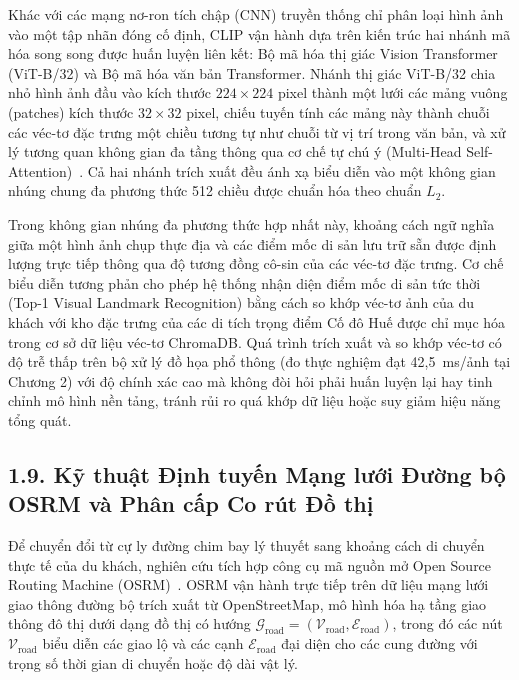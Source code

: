 Khác với các mạng nơ-ron tích chập (CNN) truyền thống chỉ phân loại hình ảnh vào một tập nhãn đóng cố định, CLIP vận hành dựa trên kiến trúc hai nhánh mã hóa song song được huấn luyện liên kết: Bộ mã hóa thị giác Vision Transformer (ViT-B/32) và Bộ mã hóa văn bản Transformer. Nhánh thị giác ViT-B/32 chia nhỏ hình ảnh đầu vào kích thước $224 \times 224$ pixel thành một lưới các mảng vuông (patches) kích thước $32 \times 32$ pixel, chiếu tuyến tính các mảng này thành chuỗi các véc-tơ đặc trưng một chiều tương tự như chuỗi từ vị trí trong văn bản, và xử lý tương quan không gian đa tầng thông qua cơ chế tự chú ý (Multi-Head Self-Attention)~\cite{vaswani2017attention}. Cả hai nhánh trích xuất đều ánh xạ biểu diễn vào một không gian nhúng chung đa phương thức 512 chiều được chuẩn hóa theo chuẩn $L_2$.

Trong không gian nhúng đa phương thức hợp nhất này, khoảng cách ngữ nghĩa giữa một hình ảnh chụp thực địa và các điểm mốc di sản lưu trữ sẵn được định lượng trực tiếp thông qua độ tương đồng cô-sin của các véc-tơ đặc trưng. Cơ chế biểu diễn tương phản cho phép hệ thống nhận diện điểm mốc di sản tức thời (Top-1 Visual Landmark Recognition) bằng cách so khớp véc-tơ ảnh của du khách với kho đặc trưng của các di tích trọng điểm Cố đô Huế được chỉ mục hóa trong cơ sở dữ liệu véc-tơ ChromaDB. Quá trình trích xuất và so khớp véc-tơ có độ trễ thấp trên bộ xử lý đồ họa phổ thông (đo thực nghiệm đạt 42,5~ms/ảnh tại Chương 2) với độ chính xác cao mà không đòi hỏi phải huấn luyện lại hay tinh chỉnh mô hình nền tảng, tránh rủi ro quá khớp dữ liệu hoặc suy giảm hiệu năng tổng quát.

\subsection*{1.9. Kỹ thuật Định tuyến Mạng lưới Đường bộ OSRM và Phân cấp Co rút Đồ thị}
{}

Để chuyển đổi từ cự ly đường chim bay lý thuyết sang khoảng cách di chuyển thực tế của du khách, nghiên cứu tích hợp công cụ mã nguồn mở Open Source Routing Machine (OSRM)~\cite{luxen2011osrm}. OSRM vận hành trực tiếp trên dữ liệu mạng lưới giao thông đường bộ trích xuất từ OpenStreetMap, mô hình hóa hạ tầng giao thông đô thị dưới dạng đồ thị có hướng $\mathcal{G}_{\text{road}} = (\mathcal{V}_{\text{road}}, \mathcal{E}_{\text{road}})$, trong đó các nút $\mathcal{V}_{\text{road}}$ biểu diễn các giao lộ và các cạnh $\mathcal{E}_{\text{road}}$ đại diện cho các cung đường với trọng số thời gian di chuyển hoặc độ dài vật lý.

